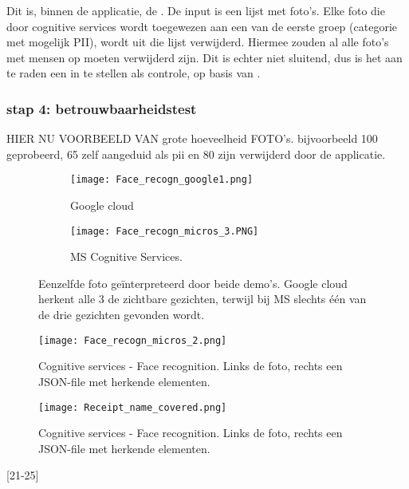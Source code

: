 Dit is, binnen de applicatie, de . De input is een lijst met foto's.
Elke foto die door cognitive services wordt toegewezen aan een  van de eerste groep (categorie met mogelijk PII), wordt uit die lijst verwijderd. Hiermee zouden al alle foto's met mensen op moeten verwijderd zijn. Dit is echter niet sluitend, dus is het aan te raden een  in te stellen als controle, op basis van . 

\subsubsection{stap 4: betrouwbaarheidstest}
HIER NU VOORBEELD VAN grote hoeveelheid FOTO's. bijvoorbeeld 100 geprobeerd, 65 zelf aangeduid als pii en 80 zijn verwijderd door de applicatie. 

\begin{figure}[h]
	\centering
	\begin{subfigure}{0.45\textwidth}
		\centering
		\texttt{[image: Face\_recogn\_google1.png]}
		\caption{Google cloud}
		\label{fig:sub1}
	\end{subfigure}%
	\begin{subfigure}{0.45\textwidth}
		\centering
		\texttt{[image: Face\_recogn\_micros\_3.PNG]}
		\caption{MS Cognitive Services.}
		\label{fig:sub2}
	\end{subfigure}
	\caption{Eenzelfde foto geïnterpreteerd door beide demo's. Google cloud herkent alle 3 de zichtbare gezichten, terwijl bij MS slechts één van de drie gezichten gevonden wordt.}
	\label{fig:test}
\end{figure}

\begin{figure}[h]
	\texttt{[image: Face\_recogn\_micros\_2.png]}
	\caption{Cognitive services - Face recognition. Links de foto, rechts een JSON-file met herkende elementen.}
	\label{fig:cognitive2}
\end{figure}

\begin{figure}[h]
	\texttt{[image: Receipt\_name\_covered.png]}
	\caption{Cognitive services - Face recognition. Links de foto, rechts een JSON-file met herkende elementen.}
	\label{fig:receipt}
\end{figure}

[21-25]

